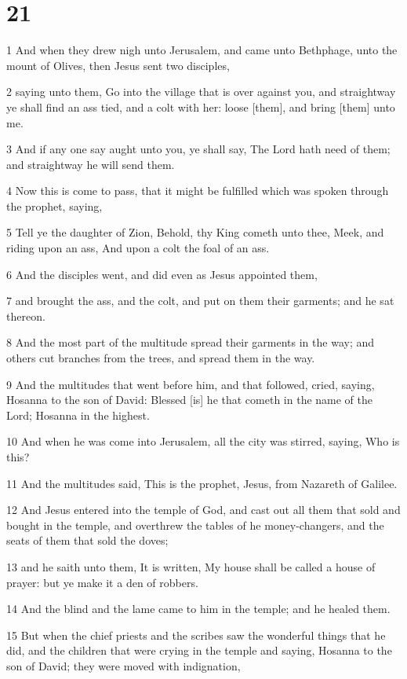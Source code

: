 \chapter{21}

\par 1 And when they drew nigh unto Jerusalem, and came unto Bethphage, unto the mount of Olives, then Jesus sent two disciples,
\par 2 saying unto them, Go into the village that is over against you, and straightway ye shall find an ass tied, and a colt with her: loose [them], and bring [them] unto me.
\par 3 And if any one say aught unto you, ye shall say, The Lord hath need of them; and straightway he will send them.
\par 4 Now this is come to pass, that it might be fulfilled which was spoken through the prophet, saying,
\par 5 Tell ye the daughter of Zion, Behold, thy King cometh unto thee, Meek, and riding upon an ass, And upon a colt the foal of an ass.
\par 6 And the disciples went, and did even as Jesus appointed them,
\par 7 and brought the ass, and the colt, and put on them their garments; and he sat thereon.
\par 8 And the most part of the multitude spread their garments in the way; and others cut branches from the trees, and spread them in the way.
\par 9 And the multitudes that went before him, and that followed, cried, saying, Hosanna to the son of David: Blessed [is] he that cometh in the name of the Lord; Hosanna in the highest.
\par 10 And when he was come into Jerusalem, all the city was stirred, saying, Who is this?
\par 11 And the multitudes said, This is the prophet, Jesus, from Nazareth of Galilee.
\par 12 And Jesus entered into the temple of God, and cast out all them that sold and bought in the temple, and overthrew the tables of he money-changers, and the seats of them that sold the doves;
\par 13 and he saith unto them, It is written, My house shall be called a house of prayer: but ye make it a den of robbers.
\par 14 And the blind and the lame came to him in the temple; and he healed them.
\par 15 But when the chief priests and the scribes saw the wonderful things that he did, and the children that were crying in the temple and saying, Hosanna to the son of David; they were moved with indignation,
